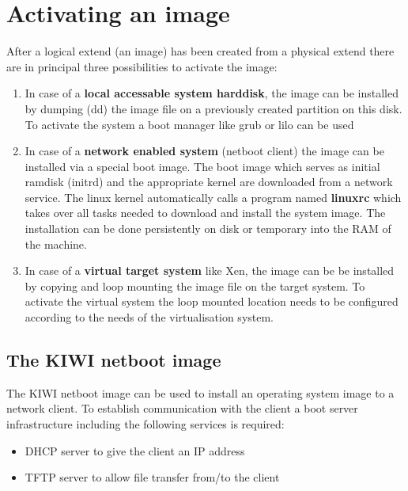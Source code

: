 \chapter{Activating an image}
\label{activate}
\minitoc
After a logical extend (an image) has been created from a physical
extend there are in principal three possibilities to activate the
image:

\begin{enumerate}
	\item In case of a \textbf{local accessable system harddisk}, the image
          can be installed by dumping (dd) the image file on a previously
          created partition on this disk. To activate the system a boot
          manager like grub or lilo can be used
	\item In case of a \textbf{network enabled system} (netboot client)
          the image can be installed via a special boot image.
          The boot image which serves as initial ramdisk (initrd) and
          the appropriate kernel are downloaded from a network service.
          The linux kernel automatically calls a program named
          \textbf{linuxrc} which takes over all tasks needed to download
          and install the system image. The installation can be done
          persistently on disk or temporary into the RAM of the machine.
	\item In case of a \textbf{virtual target system} like Xen, the image can
          be be installed by copying and loop mounting the image file on
          the target system. To activate the virtual system the loop mounted
          location needs to be configured according to the needs of the
          virtualisation system.
\end{enumerate}

\section{The KIWI netboot image}

The KIWI netboot image can be used to install an operating system image to
a network client. To establish communication with the client a
boot server infrastructure including the following services is required:

\begin{itemize}
	\item DHCP server to give the client an IP address
	\item TFTP server to allow file transfer from/to the client 
\end{itemize}

